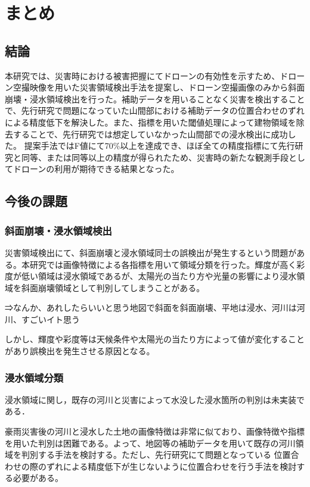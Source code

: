 \documentclass[../Thesis]{subfiles}
\begin{document}
\chapter{まとめ}
\section{結論}
	本研究では、災害時における被害把握にてドローンの有効性を示すため、ドローン空撮映像を用いた災害領域検出手法を提案し、ドローン空撮画像のみから斜面崩壊・浸水領域検出を行った。補助データを用いることなく災害を検出することで、先行研究で問題になっていた山間部における補助データの位置合わせのずれによる精度低下を解決した。また、指標を用いた閾値処理によって建物領域を除去することで、先行研究では想定していなかった山間部での浸水検出に成功した。
	\quad 提案手法ではF値にて70\%以上を達成でき、ほぼ全ての精度指標にて先行研究と同等、または同等以上の精度が得られたため、災害時の新たな観測手段としてドローンの利用が期待できる結果となった。

\section{今後の課題}
\subsection{斜面崩壊・浸水領域検出}
	災害領域検出にて、斜面崩壊と浸水領域同士の誤検出が発生するという問題がある。本研究では画像特徴による各指標を用いて領域分類を行った。輝度が高く彩度が低い領域は浸水領域であるが、太陽光の当たり方や光量の影響により浸水領域を斜面崩壊領域として判別してしまうことがある。
	
	⇒なんか、あれしたらいいと思う地図で斜面を斜面崩壊、平地は浸水、河川は河川、すごいイト思う	
	
	しかし、輝度や彩度等は天候条件や太陽光の当たり方によって値が変化することがあり誤検出を発生させる原因となる。

\subsection{浸水領域分類}
	浸水領域に関し，既存の河川と災害によって水没した浸水箇所の判別は未実装である．
	
	
	豪雨災害後の河川と浸水した土地の画像特徴は非常に似ており、画像特徴や指標を用いた判別は困難である。よって、地図等の補助データを用いて既存の河川領域を判別する手法を検討する。ただし、先行研究にて問題となっている	位置合わせの際のずれによる精度低下が生じないように位置合わせを行う手法を検討する必要がある。
	
\end{document}
